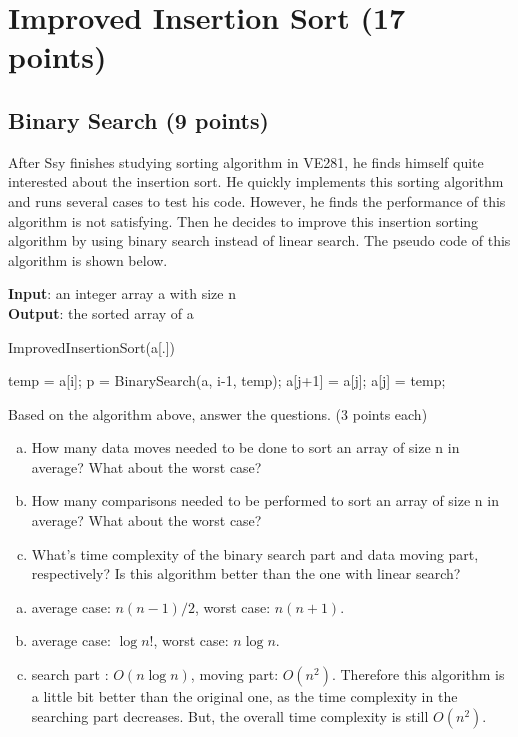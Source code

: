 \documentclass[11pt]{exam}
\begin{document}
\section{Improved Insertion Sort (17 points)}
\subsection{Binary Search (9 points)}
After Ssy finishes studying sorting algorithm in VE281, he finds himself quite interested about the insertion sort. He quickly implements this sorting algorithm and runs several cases to test his code. However, he finds the performance of this algorithm is not satisfying. Then he decides to improve this insertion sorting algorithm by using binary search instead of linear search. The pseudo code of this algorithm is shown below.
\begin{algorithm}[H]
	\textbf{Input}: an integer array a with size n\\
	\textbf{Output}: the sorted array of a
	\caption{ImprovedInsertionSort(a[.])}
	\begin{algorithmic}[1]
            \State temp = a[i];  
            \State p = BinarySearch(a, i-1, temp);
                \State a[j+1] = a[j];
            \EndFor
            \State a[j] = temp;
        \EndFor  
	\end{algorithmic}  
\end{algorithm}
Based on the algorithm above, answer the questions. (3 points each)
\begin{enumerate}[a)]
    \item How many data moves needed to be done to sort an array of size n in average?
    What about the worst case?
    \item How many comparisons needed to be performed to sort an array of size n in average? What about the worst case?
    \item What's time complexity of the binary search part and data moving part, respectively? Is this algorithm better than the one with linear search?
\end{enumerate}

\begin{solution}
    \begin{enumerate}[a)]
        \item average case: $n(n-1)/2$, worst case: $n(n+1)$.
        \item average case: $\log n!$, worst case: $n \log n$.
        \item search part : $O(n \log n)$, moving part: $O(n^2)$. Therefore
        this algorithm is a little bit better than the original one, as the 
        time complexity in the searching part decreases. But, the overall time complexity
        is still $O(n^2)$.
    \end{enumerate}
\end{solution}
\end{document}
